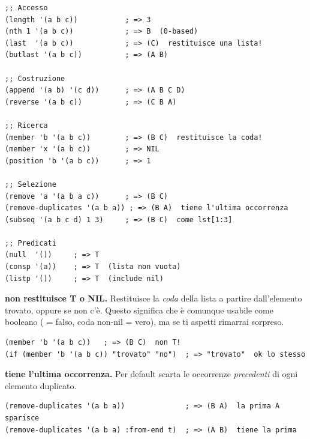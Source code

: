 
\begin{esempio}
\begin{lstlisting}
;; Accesso
(length '(a b c))           ; => 3
(nth 1 '(a b c))            ; => B  (0-based)
(last  '(a b c))            ; => (C)  restituisce una lista!
(butlast '(a b c))          ; => (A B)

;; Costruzione
(append '(a b) '(c d))      ; => (A B C D)
(reverse '(a b c))          ; => (C B A)

;; Ricerca
(member 'b '(a b c))        ; => (B C)  restituisce la coda!
(member 'x '(a b c))        ; => NIL
(position 'b '(a b c))      ; => 1

;; Selezione
(remove 'a '(a b a c))      ; => (B C)
(remove-duplicates '(a b a)) ; => (B A)  tiene l'ultima occorrenza
(subseq '(a b c d) 1 3)     ; => (B C)  come lst[1:3]

;; Predicati
(null  '())     ; => T
(consp '(a))    ; => T  (lista non vuota)
(listp '())     ; => T  (include nil)
\end{lstlisting}
\end{esempio}

\begin{attenzione}
\textbf{ non restituisce T o NIL.}
Restituisce la \emph{coda} della lista a partire dall'elemento trovato,
oppure  se non c'è. Questo significa che è comunque usabile
come booleano ( = falso, coda non-nil = vero), ma se ti aspetti
 rimarrai sorpreso.
\begin{lstlisting}
(member 'b '(a b c))   ; => (B C)  non T!
(if (member 'b '(a b c)) "trovato" "no")  ; => "trovato"  ok lo stesso
\end{lstlisting}
\end{attenzione}

\begin{attenzione}
\textbf{ tiene l'ultima occorrenza.}
Per default scarta le occorrenze \emph{precedenti} di ogni elemento duplicato.
\begin{lstlisting}
(remove-duplicates '(a b a))              ; => (B A)  la prima A sparisce
(remove-duplicates '(a b a) :from-end t)  ; => (A B)  tiene la prima
\end{lstlisting}
\end{attenzione}

